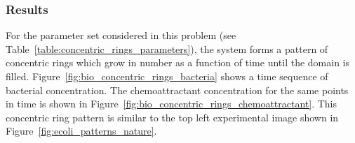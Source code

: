 \subsubsection{Results}
For the parameter set considered in this problem (see Table~\ref{table:concentric_rings_parameters}), the system forms a pattern of concentric rings which grow in number as a function of time until the domain is filled. Figure~\ref{fig:bio_concentric_rings_bacteria} shows a time sequence of bacterial concentration.  The chemoattractant concentration for the same points in time is shown in Figure~\ref{fig:bio_concentric_rings_chemoattractant}. This concentric ring pattern is similar to the top left experimental image shown in Figure~\ref{fig:ecoli_patterns_nature}.
\begin{figure}
  \begin{center}

\end{center}
\end{figure}

